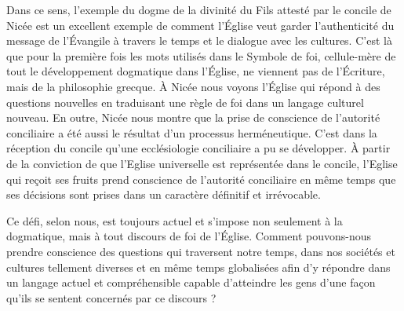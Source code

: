 Dans ce sens, l’exemple du dogme de la divinité du Fils attesté par le concile de Nicée est un excellent exemple de comment l’Église veut garder l’authenticité du message de l’Évangile à travers le temps et le dialogue avec les cultures. C’est là que pour la première fois les mots utilisés dans le Symbole de foi, cellule-mère de tout le développement dogmatique dans l’Église, ne viennent pas de l’Écriture, mais de la philosophie grecque. À Nicée nous voyons l’Église qui répond à des questions nouvelles en traduisant une règle de foi dans un langage culturel nouveau. En outre, Nicée nous montre que la prise de conscience de l’autorité conciliaire a été aussi le résultat d’un processus herméneutique. C’est dans la réception du concile qu’une ecclésiologie conciliaire a pu se développer. À partir de la conviction de que l’Eglise universelle est représentée dans le concile, l’Eglise qui reçoit ses fruits prend conscience de l’autorité conciliaire en même temps que ses décisions sont prises dans un caractère définitif et irrévocable. 

Ce défi, selon nous, est toujours actuel et s’impose non seulement à la dogmatique, mais à tout discours de foi de l’Église. Comment pouvons-nous prendre conscience des questions qui traversent notre temps, dans nos sociétés et cultures tellement diverses et en même temps globalisées afin d’y répondre dans un langage actuel et compréhensible capable d’atteindre les gens d’une façon qu’ils se sentent concernés par ce discours ?

